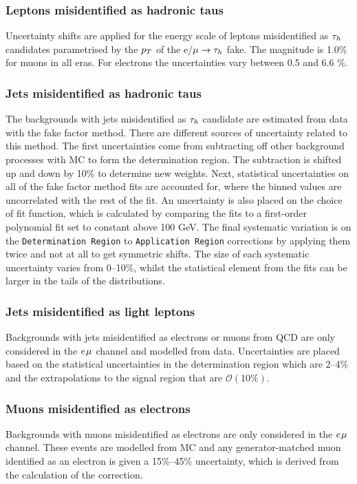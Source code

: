 \subsubsection{Leptons misidentified as hadronic taus}
Uncertainty shifts are applied for the energy scale of leptons misidentified as $\tau_{h}$ candidates parametrised by the $p_{T}$ of the e/$\mu\rightarrow\tau_{h}$ fake.
The magnitude is 1.0\% for muons in all eras. 
For electrons the uncertainties vary between 0.5 and 6.6 \%.

\subsubsection{Jets misidentified as hadronic taus}
The backgrounds with jets misidentified as $\tau_{h}$ candidate are estimated from data with the fake factor method. 
There are different sources of uncertainty related to this method.
The first uncertainties come from subtracting off other background processes with \ac{MC} to form the determination region. 
The subtraction is shifted up and down by 10\% to determine new weights.
Next, statistical uncertainties on all of the fake factor method fits are accounted for, where the binned values are uncorrelated with the rest of the fit.
An uncertainty is also placed on the choice of fit function, which is calculated by comparing the fits to a first-order polynomial fit set to constant above 100 GeV.
The final systematic variation is on the \texttt{Determination Region} to \texttt{Application Region} corrections by applying them twice and not at all to get symmetric shifts.
The size of each systematic uncertainty varies from 0--10\%, whilst the statistical element from the fits can be larger in the tails of the distributions.

\subsubsection{Jets misidentified as light leptons}
Backgrounds with jets misidentified as electrons or muons from \ac{QCD} are only considered in the $e_{}\mu_{}$ channel and modelled from data.
Uncertainties are placed based on the statistical uncertainties in the determination region which are 2--4\% and the extrapolations to the signal region that are $\mathcal{O}(10\%)$.

\subsubsection{Muons misidentified as electrons}
Backgrounds with muons misidentified as electrons are only considered in the $e_{}\mu_{}$ channel.
These events are modelled from \ac{MC} and any generator-matched muon identified as an electron is given a 15\%--45\% uncertainty, which is derived from the calculation of the correction.

